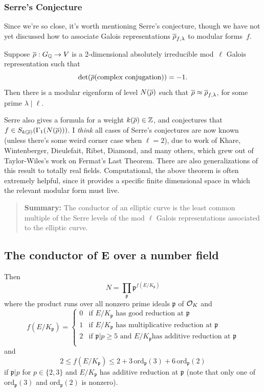 \documentclass{book}
\begin{document}
\subsubsection{Serre's Conjecture}
Since we're so close, it's worth mentioning Serre's conjecture,
though we have not yet discussed how to
associate Galois representations $\overline{\rho}_{f,\lambda}$
to modular forms~$f$.
\begin{theorem}
Suppose $\overline{\rho}:G_{\mathbb{Q}}\to V$
is a 2-dimensional absolutely irreducible
mod~$\ell$ Galois representation such that
$$\det(\overline{\rho}(\text{\rm complex conjugation})) =-1.$$
Then there is a modular eigenform of level
$N(\overline{\rho})$ such that $\overline{\rho} \approx \overline{\rho}_{f,\lambda}$,
for some prime $\lambda\mid \ell$.
\end{theorem}
Serre also gives a formula for a weight $k(\overline{\rho})\in\mathbb{Z}$, and
conjectures that $f\in S_{k(\overline{\rho})}(\Gamma_1(N(\overline{\rho})))$.
I {\em think} all cases of Serre's conjectures are now known
(unless there's some weird corner case when $\ell=2$), due to
work of Khare, Wintenberger, Dieulefait, Ribet, Diamond, and many
others, which grew out of Taylor-Wiles's work on Fermat's Last Theorem.
There are also generalizations of this result to totally real
fields.  Computational, the above theorem is often extremely
helpful, since it provides a specific finite dimensional space
in which the relevant modular form must live.


\begin{quote}
{\bf Summary:} The conductor of an elliptic curve is the least common multiple
of the Serre levels of the mod $\ell$ Galois representations associated to the
elliptic curve.
\end{quote}

\subsection{The conductor of E over a number field}\label{sec:condnf}

Then
$$
N = \prod_{\mathfrak{p}} \mathfrak{p}^{f(E/K_{\mathfrak{p}})}
$$
where the product runs over all nonzero prime ideals $\mathfrak{p}$
of $\mathcal{O}_K$ and
$$
f(E/K_\mathfrak{p}) = \left\{\begin{array}{ll}
0 & \text{if $E/K_{\mathfrak{p}}$ has good reduction at $\mathfrak{p}$} \\
1 & \text{if $E/K_{\mathfrak{p}}$ has multiplicative
reduction at $\mathfrak{p}$} \\
2 & \text{if $\mathfrak{p}|p \geq 5$ and $E/K_{\mathfrak{p}}$
has additive reduction at $\mathfrak{p}$} \\
\end{array}\right.
$$
and
$$
2 \leq f(E/K_{\mathfrak{p}}) \leq 2 + 3 \, \mathrm{ord}_{\mathfrak{p}}(3)
 + 6 \, \mathrm{ord}_{\mathfrak{p}}(2)
$$
if $\mathfrak{p}|p$ for $p \in \{2, 3\}$ and $E/K_{\mathfrak{p}}$ has
additive reduction at $\mathfrak{p}$ (note that only one of
$\mathrm{ord}_{\mathfrak{p}}(3)$ and $\mathrm{ord}_{\mathfrak{p}}(2)$ is
nonzero).
\end{document}
